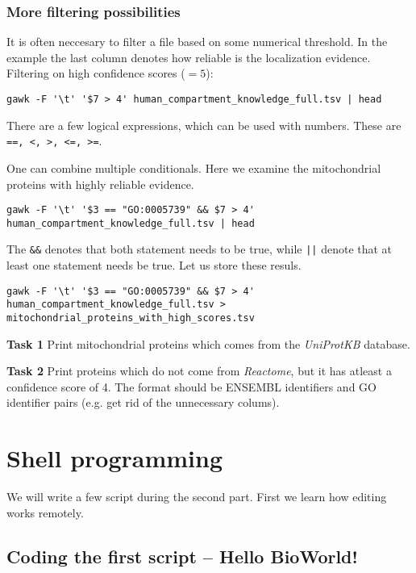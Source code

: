 \documentclass{article}\usepackage[]{graphicx}\usepackage[usenames,dvipsnames]{color}
\begin{document}
\subsubsection*{More filtering possibilities}

It is often neccesary to filter a file based on some numerical threshold. In the example the last column denotes how reliable is the localization evidence. Filtering on high confidence scores ($= 5$):

\begin{verbatim}
gawk -F '\t' '$7 > 4' human_compartment_knowledge_full.tsv | head
\end{verbatim}

There are a few logical expressions, which can be used with numbers. These are \verb+==, <, >, <=, >=+.

One can combine multiple conditionals. Here we examine the mitochondrial proteins with highly reliable evidence.

\begin{verbatim}
gawk -F '\t' '$3 == "GO:0005739" && $7 > 4' human_compartment_knowledge_full.tsv | head
\end{verbatim}

The \verb+&&+ denotes that both statement needs to be true, while \verb+||+ denote that at least one statement needs be true. Let us store these resuls.

\begin{verbatim}
gawk -F '\t' '$3 == "GO:0005739" && $7 > 4' human_compartment_knowledge_full.tsv > mitochondrial_proteins_with_high_scores.tsv
\end{verbatim}

\textbf{Task 1} Print mitochondrial proteins which comes from the \emph{UniProtKB} database.

\textbf{Task 2} Print proteins which do not come from \emph{Reactome}, but it has atleast a confidence score of 4. The format should be ENSEMBL identifiers and GO identifier pairs (e.g. get rid of the unnecessary colums).

\section{Shell programming}

We will write a few script during the second part. First we learn how editing works remotely.

\subsection*{Coding the first script -- Hello BioWorld!}
\end{document}
